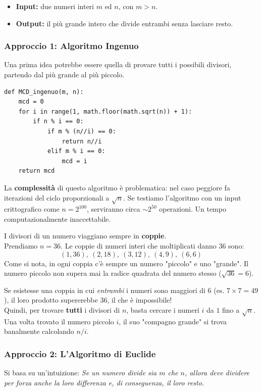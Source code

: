 \documentclass[openany,a4paper,12pt]{book}
\begin{document}
\begin{itemize}
    \item \textbf{Input:} due numeri interi $m$ ed $n$, con $m > n$.
    \item \textbf{Output:} il più grande intero che divide entrambi senza lasciare resto.
\end{itemize}

\subsubsection*{Approccio 1: Algoritmo Ingenuo}
Una prima idea potrebbe essere quella di provare tutti i possibili divisori, partendo dal più grande al più piccolo. 

\begin{lstlisting}
def MCD_ingenuo(m, n): 
    mcd = 0 
    for i in range(1, math.floor(math.sqrt(n)) + 1): 
        if n % i == 0: 
            if m % (n//i) == 0: 
                return n//i 
            elif m % i == 0:
                mcd = i 
    return mcd 
\end{lstlisting}

La \textbf{complessità} di questo algoritmo è problematica: nel caso peggiore fa iterazioni del ciclo proporzionali a $\sqrt{n}$. Se testiamo l'algoritmo con un input crittografico come $n = 2^{100}$, serviranno circa $\sim 2^{50}$ operazioni. Un tempo computazionalmente inaccettabile.

\begin{nota}[title={Perché ci fermiamo a $\sqrt{n}$? L'intuizione matematica}]
I divisori di un numero viaggiano sempre in \textbf{coppie}. \\
Prendiamo $n = 36$. Le coppie di numeri interi che moltiplicati danno 36 sono:
\[ (1, 36), \ (2, 18), \ (3, 12), \ (4, 9), \ (6, 6) \]
Come si nota, in ogni coppia c'è sempre un numero "piccolo" e uno "grande". Il numero piccolo non supera mai la radice quadrata del numero stesso ($\sqrt{36} = 6$). 

Se esistesse una coppia in cui \textit{entrambi} i numeri sono maggiori di $6$ (es. $7 \times 7 = 49$), il loro prodotto supererebbe $36$, il che è impossibile! \\
Quindi, per trovare \textbf{tutti} i divisori di $n$, basta cercare i numeri $i$ da $1$ fino a $\sqrt{n}$. Una volta trovato il numero piccolo $i$, il suo "compagno grande" si trova banalmente calcolando $n / i$.
\end{nota}

\subsubsection*{Approccio 2: L'Algoritmo di Euclide}
Si basa su un'intuizione: \textit{Se un numero divide sia $m$ che $n$, allora deve dividere per forza anche la loro differenza e, di conseguenza, il loro resto.}
\end{document}
